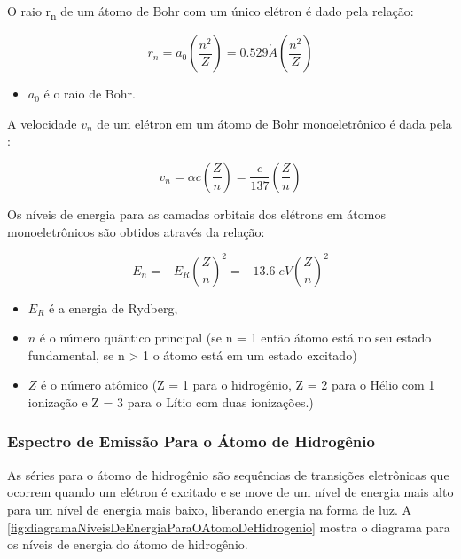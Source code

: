 \documentclass[11pt,a4paper]{article}
\newcounter{exemplo}
\begin{document}
    O raio r\textsubscript{n} de um átomo de Bohr com um único elétron é dado pela  relação:

		\begin{equation}
			r_n = a_0 \left(\frac{n^2}{Z}\right) = 0.529 \mathring{A} \left(\frac{n^2}{Z}\right)
		\end{equation}

		\begin{exemplo}[onde:]
			\begin{itemize}
				\item $a_0$ é o raio de Bohr.
			\end{itemize}
		\end{exemplo}

	A velocidade $v_n$ de um elétron em um átomo de Bohr monoeletrônico é dada pela :
	
		\begin{equation}
			v_n  = \alpha c \left(\frac{Z}{n}\right) = \frac{c}{137}\left(\frac{Z}{n}\right)
		\end{equation}

    Os níveis de energia para as camadas orbitais dos elétrons em átomos monoeletrônicos são obtidos através da relação:

		\begin{equation}
			E_n = -E_R \left(\frac{Z}{n}\right)^2 = -13.6 \; eV \left(\frac{Z}{n}\right)^2
		\end{equation}

		\begin{exemplo}[onde:]
			\begin{itemize}
				\item $E_R$ é a energia de Rydberg,
				\item  $n$ é  o número quântico principal (se n = 1 então átomo está no seu estado fundamental, se n > 1 o átomo está em um estado excitado)
				\item $Z$ é o número atômico (Z = 1 para o hidrogênio, Z = 2 para o Hélio com 1 ionização e Z = 3 para o Lítio com duas ionizações.)
			\end{itemize}
		\end{exemplo}
			
\subsubsection*{Espectro de Emissão Para o Átomo de Hidrogênio}

    As séries para o átomo de hidrogênio são sequências de transições eletrônicas que ocorrem quando um elétron é excitado e se move de um nível de energia mais alto para um nível de energia mais baixo, liberando energia na forma de luz. A \ref{fig:diagramaNiveisDeEnergiaParaOAtomoDeHidrogenio} mostra o diagrama para os níveis de energia do átomo de hidrogênio.
\end{document}
